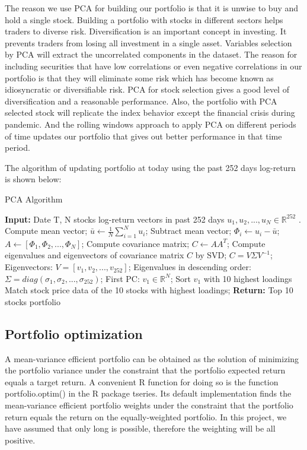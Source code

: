 \documentclass[11pts]{article}
\begin{document}
The reason we use PCA for building our portfolio is that it is unwise to buy and hold a single stock. Building a portfolio with stocks in different sectors helps traders to diverse risk. Diversification is an important concept in investing. It prevents traders from losing all investment in a single asset. Variables selection by PCA will extract the uncorrelated components in the dataset.  The reason for including securities that have low correlations or even negative correlations in our portfolio is that they will eliminate some risk which has become known as idiosyncratic or diversifiable risk. PCA for stock selection gives a good level of diversification and a reasonable performance. Also, the portfolio with PCA selected stock will replicate the index behavior except the financial crisis during pandemic. And the rolling windows approach to apply PCA on different periods of time updates our portfolio that gives out better performance in that time period.

The algorithm of updating portfolio at today using the past 252 days log-return is shown below:
\begin{algorithm}[H]
\caption{PCA Algorithm}
\begin{algorithmic}[1]
\State \textbf{Input:} Date T, N stocks log-return vectors in past 252 days $u_{1},u_{2}, ... ,u_{N} \in \mathbb{R}^{252}$ .
\State Compute mean vector;
\State $\bar{u} \gets \frac{1}{N} \sum_{i=1}^{N}u_{i}$;
\State Subtract mean vector;
    \State $\Phi_{i} \gets u_{i} - \bar{u}$;
\EndFor
\State $A \gets [\Phi_{1}, \Phi_{2}, ..., \Phi_{N}]$;
\State Compute covariance matrix;
\State $C \gets  AA^{T}$;
\State Compute eigenvalues and eigenvectors of covariance matrix $C$ by SVD;
\State $C = V \Sigma V^{-1}$;
\State Eigenvectors:
\State $V = [v_{1}, v_{2}, ..., v_{252}]$;
\State Eigenvalues in descending order:
\State $\Sigma = diag(\sigma_{1}, \sigma_{2}, ..., \sigma_{252})$;
\State First PC: $v_{1} \in \mathbb{R}^{N}$;
\State Sort $v_{1}$ with 10 highest loadings
\State Match stock price data of the 10 stocks with highest loadings;
\State \textbf{Return:} Top 10 stocks portfolio
\end{algorithmic}
\end{algorithm}
\subsection{Portfolio optimization}
\label{sec:org940492e}
A mean-variance efficient portfolio can be obtained as the solution of minimizing the portfolio variance under the constraint that the portfolio expected return equals a target return. A convenient R function for doing so is the function portfolio.optim() in the R package tseries. Its default implementation finds the mean-variance efficient portfolio weights under the constraint that the portfolio return equals the return on the equally-weighted portfolio. In this project, we have assumed that only long is possible, therefore the weighting will be all positive.
\end{document}
